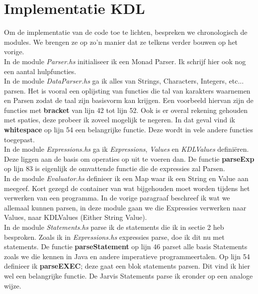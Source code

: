 \documentclass[a4paper]{article}
\begin{document}
\section{Implementatie KDL}
Om de implementatie van de code toe te lichten, bespreken we chronologisch de modules. We brengen ze op zo'n manier dat ze telkens verder bouwen op het vorige. \\

In de module \textit{Parser.hs} initialiseer ik een Monad Parser. Ik schrijf hier ook nog een aantal hulpfuncties. \\

In de module \textit{DataParser.hs}  ga ik alles van Strings, Characters, Integers, etc... parsen. Het is vooral een oplijsting van functies die tal van karakters waarnemen en Parsen zodat de taal zijn basisvorm kan krijgen. Een voorbeeld hiervan zijn de functies met \textbf{bracket} van lijn 42 tot lijn 52. 
Ook is er overal rekening gehouden met spaties, deze probeer ik zoveel mogelijk te negeren. In dat geval vind ik \textbf{whitespace} op lijn 54 een belangrijke functie. Deze wordt in vele andere functies toegepast. \\ 

In de module \textit{Expressions.hs} ga ik \textit{Expressions}, \textit{Values} en \textit{KDLValues} definiëren. Deze liggen aan de basis om operaties op uit te voeren dan. De functie \textbf{parseExp} op lijn 83 is eigenlijk de omvattende functie die de expressies zal Parsen. \\

In de module \textit{Evaluator.hs} definieer ik een Map waar ik een String en Value aan meegeef. Kort gezegd de container van wat bijgehouden moet worden tijdens het verwerken van een programma. In de vorige paragraaf beschreef ik wat we allemaal kunnen parsen, in deze module gaan we die Expressies verwerken naar Values, naar KDLValues (Either String Value). \\

In de module \textit{Statements.hs} parse ik de statements die ik in sectie 2 heb besproken. Zoals ik in \textit{Expressions.hs} expressies parse, doe ik dit nu met statements. De functie \textbf{parseStatement} op lijn 46 parset alle basis Statements zoals we die kennen in Java en andere imperatieve programmeertalen. Op lijn 54 definieer ik \textbf{parseEXEC}; deze gaat een blok statements parsen. Dit vind ik hier wel een belangrijke functie. De Jarvis Statements parse ik eronder op een analoge wijze. \\
\end{document}
